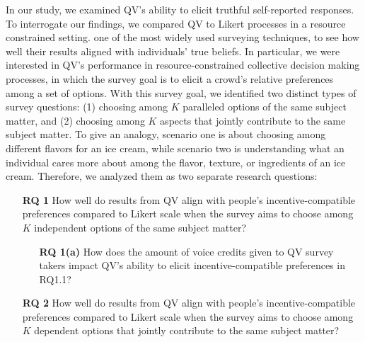 In our study, we examined QV's ability to elicit truthful self-reported responses. To interrogate our findings, we compared QV to Likert processes \cite{likert1932technique} in a resource constrained setting. one of the most widely used surveying techniques, to see how well their results aligned with individuals' true beliefs. In particular, we were interested in QV's performance in resource-constrained collective decision making processes, in which the survey goal is to elicit a crowd's relative preferences among a set of options. With this survey goal, we identified two distinct types of survey questions: (1) choosing among $K$ paralleled options of the same subject matter, and (2) choosing among $K$ aspects that jointly contribute to the same subject matter. To give an analogy, scenario one is about choosing among different flavors for an ice cream, while scenario two is understanding what an individual cares more about among the flavor, texture, or ingredients of an ice cream. Therefore, we analyzed them as two separate research questions:


\begin{itemize}[leftmargin=0.6in]
    \item[\textbf{RQ 1}] How well do results from QV align with people's incentive-compatible preferences compared to Likert scale when the survey aims to choose among $K$ independent options of the same subject matter?
    \begin{itemize}[leftmargin=0.6in]
        \item[\textbf{RQ 1(a)}] How does the amount of voice credits given to QV survey takers impact QV's ability to elicit incentive-compatible preferences in RQ1.1?
    \end{itemize}
    \item[\textbf{RQ 2}] How well do results from QV align with people's incentive-compatible preferences compared to Likert scale when the survey aims to choose among $K$ dependent options that jointly contribute to the same subject matter? 
\end{itemize}

